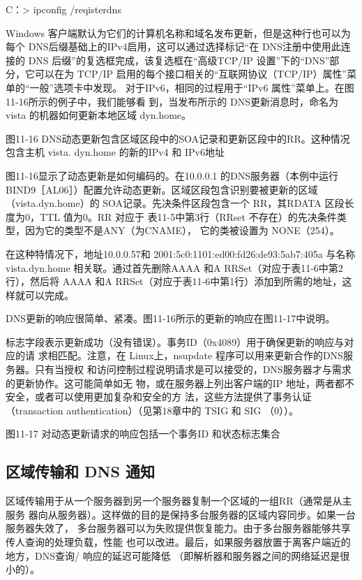 C：> ipconfig /reqisterdns

Windows 客户端默认为它们的计算机名称和域名发布更新，但是这种行也可以为每个
DNS后缀基础上的IPv4启用，这可以通过选择标记“在 DNS注册中使用此连接的 DNS
后缀”的复选框完成，该复选框在“高级TCP/IP 设置”下的“DNS”部分，它可以在为
TCP/IP 启用的每个接口相关的“互联网协议（TCP/IP）属性”菜单的“一般”选项卡中发现。
对于IPv6，相同的过程用于“IPv6 属性”菜单上。在图11-16所示的例子中，我们能够看
到，当发布所示的 DNS更新消息时，命名为vista 的机器如何更新本地区域 dyn.home。

图11-16
DNS动态更新包含区域区段中的SOA记录和更新区段中的RR。这种情况包含主机 vista.
dyn.home 的新的IPv4 和 IPv6地址

图11-16显示了动态更新是如何编码的。在10.0.0.1 的DNS服务器（本例中运行
BIND9［AL06］）配置允许动态更新。区域区段包含识别要被更新的区域（vista.dyn.home）的
SOA记录。先决条件区段包含一个 RR，其RDATA 区段长度为0，TTL 值为0。RR 对应于
表11-5中第3行（RRset 不存在）的先决条件类型，因为它的类型不是ANY（为CNAME），
它的类被设置为 NONE（254）。

在这种特情况下，地址10.0.0.57和 2001:5c0:1101:ed00:fd26:de93:5ab7:405a 与名称
vista.dyn.home 相关联。通过首先删除AAAA 和A RRSet（对应于表11-6中第2行），然后将
AAAA 和A RRSet（对应于表11-6中第1行）添加到所需的地址，这样就可以完成。

DNS更新的响应很简单、紧凑。图11-16所示的更新的响应在图11-17中说明。

标志字段表示更新成功（没有错误）。事务ID（0x4089）用于确保更新的响应与对应的请
求相匹配。注意，在 Linux上，nsupdate 程序可以用来更新合作的DNS服务器。只有当授权
和访问控制过程说明请求是可以接受的，DNS服务器才与需求的更新协作。这可能简单如无
物，或在服务器上列出客户端的IP 地址，两者都不安全，或者可以使用更加复杂和安全的方
法，这些方法提供了事务认证 （transaction authentication）（见第18章中的 TSIG 和 SIG （0））。

图11-17 对动态更新请求的响应包括一个事务ID 和状态标志集合

\subsection{区域传输和 DNS 通知}

区域传输用于从一个服务器到另一个服务器复制一个区域的一组RR（通常是从主服务
器向从服务器）。这样做的目的是保持多台服务器的区域内容同步。如果一台服务器失效了，
多台服务器可以为失败提供恢复能力。由于多台服务器能够共享传人查询的处理负载，性能
也可以改进。最后，如果服务器放置于离客户端近的地方，DNS查询/ 响应的延迟可能降低
（即解析器和服务器之间的网络延迟是很小的）。


